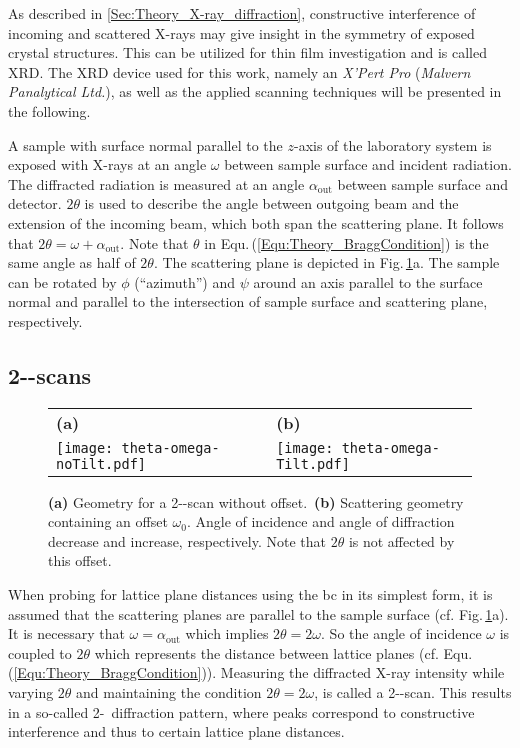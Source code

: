 \label{Sec:Methods_XRD}
As described in \ref{Sec:Theory_X-ray_diffraction}, constructive interference of incoming and scattered X-rays may give insight in the symmetry of exposed crystal structures.
This can be utilized for thin film investigation and is called \gls{XRD}.
The \gls{XRD} device used for this work, namely an \textit{X'Pert Pro} (\textit{Malvern Panalytical Ltd.}), as well as the applied scanning techniques will be presented in the following.

A sample with surface normal parallel to the $z$-axis of the laboratory system is exposed with X-rays at an angle $\omega$ between sample surface and incident radiation.
The diffracted radiation is measured at an angle $\alpha_\mathrm{out}$ between sample surface and detector.
$2\theta$ is used to describe the angle between outgoing beam and the extension of the incoming beam, which both span the scattering plane.
It follows that $2\theta=\omega+\alpha_\mathrm{out}$.
Note that $\theta$ in Equ.\,(\ref{Equ:Theory_BraggCondition}) is the same angle as half of $2\theta$.
The scattering plane is depicted in Fig.\,\ref{Fig:Methods_XRD_geometry}a.
The sample can be rotated by $\phi$ (\enquote{azimuth}) and $\psi$ around an axis parallel to the surface normal and parallel to the intersection of sample surface and scattering plane, respectively.

\subsection{2\texttheta-\textomega-scans}
    \label{Sec:Methods_2ThetaOmega}
\begin{figure}
    \centering
    \begin{tabular}{ll}
        \textbf{(a)}&\textbf{(b)}\\
        \texttt{[image: theta-omega-noTilt.pdf]}
        &\texttt{[image: theta-omega-Tilt.pdf]}
    \end{tabular}
    \caption{\textbf{(a)} Geometry for a 2\texttheta-\textomega-scan without offset.\ \textbf{(b)} Scattering geometry containing an offset $\omega_0$. Angle of incidence and angle of diffraction decrease and increase, respectively. Note that $2\theta$ is not affected by this offset.}
    \label{Fig:Methods_XRD_geometry}
\end{figure}
When probing for lattice plane distances using the \gls{bc} in its simplest form, it is assumed that the scattering planes are parallel to the sample surface (cf. Fig.\,\ref{Fig:Methods_XRD_geometry}a).
It is necessary that $\omega=\alpha_\mathrm{out}$ which implies $2\theta=2\omega$.
So the angle of incidence $\omega$ is coupled to $2\theta$ which represents the distance between lattice planes (cf. Equ.\,(\ref{Equ:Theory_BraggCondition})).
Measuring the diffracted X-ray intensity while varying $2\theta$ and maintaining the condition $2\theta=2\omega$, is called a 2\texttheta-\textomega-scan.
This results in a so-called 2\texttheta-\textomega\ diffraction pattern, where peaks correspond to constructive interference and thus to certain lattice plane distances.

